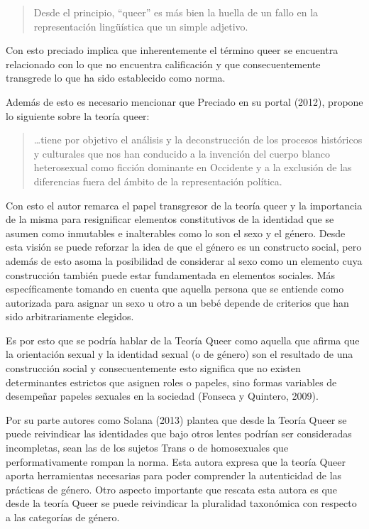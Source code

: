 \begin{quote}
    Desde el principio, “queer” es más bien la huella de un fallo en la
    representación lingüística que un simple adjetivo.
\end{quote}

Con esto preciado implica que inherentemente el término queer se encuentra
relacionado con lo que no encuentra calificación y que consecuentemente
transgrede lo que ha sido establecido como norma.

Además de esto es necesario mencionar que Preciado en su portal (2012),
propone lo siguiente sobre la teoría queer:

\begin{quote}
    …tiene por objetivo el análisis y la deconstrucción de los procesos históricos
    y culturales que nos han conducido a la invención del cuerpo blanco
    heterosexual como ficción dominante en Occidente y a la exclusión de las
    diferencias fuera del ámbito de la representación política.
\end{quote}

Con esto el autor remarca el papel transgresor de la teoría queer y la
importancia de la misma para resignificar elementos constitutivos de la
identidad que se asumen como inmutables e inalterables como lo son el sexo y el
género.
Desde esta visión se puede reforzar la idea de que el género es un constructo
social, pero además de esto asoma la posibilidad de considerar al sexo como un
elemento cuya construcción también puede estar fundamentada en elementos
sociales.
Más específicamente tomando en cuenta que aquella persona que se
entiende como autorizada para asignar un sexo u otro a un bebé depende de
criterios que han sido arbitrariamente elegidos.

Es por esto que se podría hablar de la Teoría Queer como aquella que afirma que
la orientación sexual y la identidad sexual (o de género) son el resultado de
una construcción social y consecuentemente esto significa que no existen
determinantes estrictos que asignen roles o papeles, sino formas variables de
desempeñar papeles sexuales en la sociedad (Fonseca y Quintero, 2009).

Por su parte autores como Solana (2013) plantea que desde la Teoría Queer se
puede reivindicar las identidades que bajo otros lentes podrían ser consideradas
incompletas, sean las de los sujetos Trans o de homosexuales que
performativamente rompan la norma.
Esta autora expresa que la teoría Queer aporta herramientas necesarias para
poder comprender la autenticidad de las prácticas de género.
Otro aspecto importante que rescata esta autora es que desde la teoría Queer se
puede reivindicar la pluralidad taxonómica con respecto a las categorías de
género.

